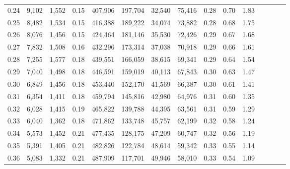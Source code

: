 \begin{tabular}{rrrcrrrrrrrrrrr}
0.24 &   9,102 &   1,552 &                                       0.15 &  407,906 &  197,704 &   32,540 &   75,416 &  0.28 &  0.70 &                         1.83 \\
0.25 &   8,482 &   1,534 &                                       0.15 &  416,388 &  189,222 &   34,074 &   73,882 &  0.28 &  0.68 &                         1.75 \\
0.26 &   8,076 &   1,456 &                                       0.15 &  424,464 &  181,146 &   35,530 &   72,426 &  0.29 &  0.67 &                         1.68 \\
0.27 &   7,832 &   1,508 &                                       0.16 &  432,296 &  173,314 &   37,038 &   70,918 &  0.29 &  0.66 &                         1.61 \\
0.28 &   7,255 &   1,577 &                                       0.18 &  439,551 &  166,059 &   38,615 &   69,341 &  0.29 &  0.64 &                         1.54 \\
0.29 &   7,040 &   1,498 &                                       0.18 &  446,591 &  159,019 &   40,113 &   67,843 &  0.30 &  0.63 &                         1.47 \\
0.30 &   6,849 &   1,456 &                                       0.18 &  453,440 &  152,170 &   41,569 &   66,387 &  0.30 &  0.61 &                         1.41 \\
0.31 &   6,354 &   1,411 &                                       0.18 &  459,794 &  145,816 &   42,980 &   64,976 &  0.31 &  0.60 &                         1.35 \\
0.32 &   6,028 &   1,415 &                                       0.19 &  465,822 &  139,788 &   44,395 &   63,561 &  0.31 &  0.59 &                         1.29 \\
0.33 &   6,040 &   1,362 &                                       0.18 &  471,862 &  133,748 &   45,757 &   62,199 &  0.32 &  0.58 &                         1.24 \\
0.34 &   5,573 &   1,452 &                                       0.21 &  477,435 &  128,175 &   47,209 &   60,747 &  0.32 &  0.56 &                         1.19 \\
0.35 &   5,391 &   1,405 &                                       0.21 &  482,826 &  122,784 &   48,614 &   59,342 &  0.33 &  0.55 &                         1.14 \\
0.36 &   5,083 &   1,332 &                                       0.21 &  487,909 &  117,701 &   49,946 &   58,010 &  0.33 &  0.54 &                         1.09 \\

\end{tabular}
